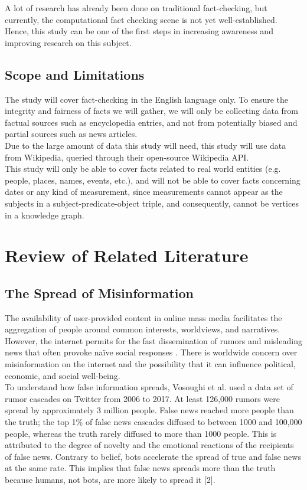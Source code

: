 \documentclass[10pt,11pt,12pt,oneside]{book}
\begin{document}
		A lot of research has already been done on traditional fact-checking, but currently, the computational fact checking scene is not yet well-established. Hence, this study can be one of the first steps in increasing awareness and improving research on this subject.\\
	
	\section{Scope and Limitations}
		The study will cover fact-checking in the English language only. To ensure the integrity and fairness of facts we will gather, we will only be collecting data from factual sources such as encyclopedia entries, and not from potentially biased and partial sources such as news articles.\\
		
		Due to the large amount of data this study will need, this study will use data from Wikipedia, queried through their open-source Wikipedia API.\\
		
		This study will only be able to cover facts related to real world entities (e.g. people, places, names, events, etc.), and will not be able to cover facts concerning dates or any kind of measurement, since measurements cannot appear as the subjects in a subject-predicate-object triple, and consequently, cannot be vertices in a knowledge graph.\\

\chapter{Review of Related Literature}
	\section{The Spread of Misinformation}
	The availability of user-provided content in online mass media facilitates the aggregation of people around common interests, worldviews, and narratives. However, the internet permits for the fast dissemination of rumors and misleading news that often provoke naïve social responses \cite{DelVicario_2016}. There is worldwide concern over misinformation on the internet and the possibility that it can influence political, economic, and social well-being.\\[8pt]
	
	To understand how false information spreads, Vosoughi et al. used a data set of rumor cascades on Twitter from 2006 to 2017. At least 126,000 rumors were spread by approximately 3 million people. False news reached more people than the truth; the top 1\% of false news cascades diffused to between 1000 and 100,000 people, whereas the truth rarely diffused to more than 1000 people. This is attributed to the degree of novelty and the emotional reactions of the recipients of false news. Contrary to belief, bots accelerate the spread of true and false news at the same rate. This implies that false news spreads more than the truth because humans, not bots, are more likely to spread it [2].
	
\end{document}

